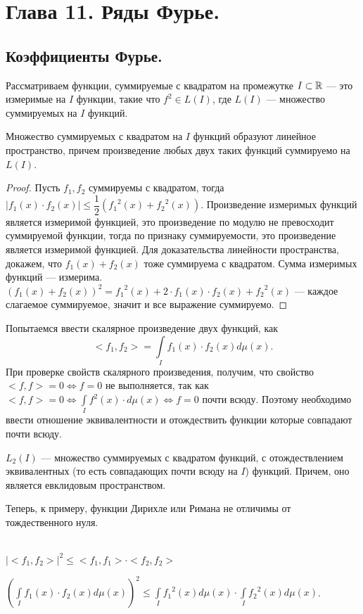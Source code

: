 \setcounter{section}{10}
\section{Глава 11. Ряды Фурье.}
\subsection{Коэффициенты Фурье.}
Рассматриваем функции, суммируемые с квадратом на промежутке $I\subset \mathbb{R}$ --- это измеримые на $I$ функции, такие что $f^2\in L(I)$, где $L(I)$ --- множество суммируемых на $I$ функций.

\begin{prop}
	Множество суммируемых с квадратом на $I$ функций образуют линейное пространство, причем произведение любых двух таких функций суммируемо на $L(I)$.
\end{prop}

\begin{proof}
	Пусть $f_1, f_2$ суммируемы с квадратом, тогда $|f_1(x)\cdot f_2(x)|\leqslant\dfrac{1}{2} \left({f_1}^2(x)+{f_2}^2(x)\right)$. Произведение измеримых функций является измеримой функцией, это произведение по модулю не превосходит суммируемой функции, тогда по признаку суммируемости, это произведение является измеримой функцией. Для доказательства линейности пространства, докажем, что $f_1(x)+f_2(x)$ тоже суммируема с квадратом. Сумма измеримых функций --- измерима. $(f_1(x)+f_2(x))^2={f_1}^2(x)+2\cdot f_1(x)\cdot f_2(x) + {f_2}^2(x)$ --- каждое слагаемое суммируемое, значит и все выражение суммируемо.
\end{proof}

Попытаемся ввести скалярное произведение двух функций, как $$<f_1, f_2>=\int\limits_{I}f_1(x)\cdot f_2(x)d\mu(x).$$ При проверке свойств скалярного произведения, получим, что свойство $<f,f>=0\Leftrightarrow f=0$ не выполняется, так как $<f,f>=0\Leftrightarrow \int\limits_{I}f^2(x)\cdot d\mu(x)\Leftrightarrow f=0$ почти всюду. Поэтому необходимо ввести отношение эквивалентности и отождествить функции которые совпадают почти всюду.

\begin{Def}
	$L_2(I)$ --- множество суммируемых с квадратом функций, с отождествлением эквивалентных (то есть совпадающих почти всюду на $I$) функций. Причем, оно является евклидовым пространством.
\end{Def}

Теперь, к примеру, функции Дирихле или Римана не отличимы от тождественного нуля.
\begin{prop}\ \\
	$|<f_1,f_2>|^2\leqslant <f_1,f_1>\cdot<f_2,f_2>$
	
	$\left(\int\limits_{I}f_1(x)\cdot f_2(x)d\mu(x)\right)^2\leqslant\int\limits_{I}{f_1}^2(x)d\mu(x)\cdot \int\limits_{I}{f_2}^2(x)d\mu(x)$.
\end{prop}

